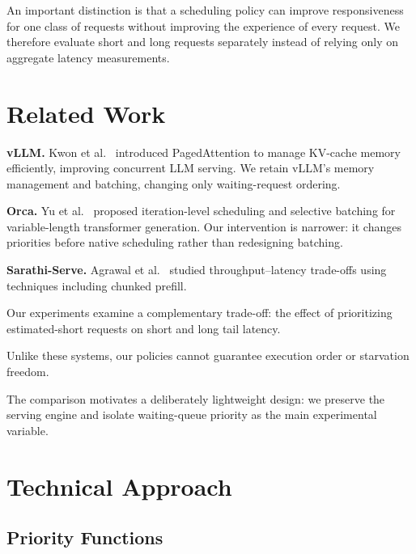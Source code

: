 \documentclass[sigplan,nonacm]{acmart}
\begin{document}
An important distinction is that a scheduling policy
can improve responsiveness for one class of requests
without improving the experience of every request.
We therefore evaluate short and long requests
separately instead of relying only on aggregate
latency measurements.


\section{Related Work}

\textbf{vLLM.}
Kwon et al.~\cite{kwon2023efficient} introduced
PagedAttention to manage KV-cache memory efficiently,
improving concurrent LLM serving. We retain vLLM's
memory management and batching, changing only
waiting-request ordering.

\textbf{Orca.}
Yu et al.~\cite{yu2022orca} proposed iteration-level
scheduling and selective batching for variable-length
transformer generation. Our intervention is narrower:
it changes priorities before native scheduling rather
than redesigning batching.

\textbf{Sarathi-Serve.}
Agrawal et al.~\cite{agrawal2024sarathi} studied
throughput--latency trade-offs using techniques
including chunked prefill.

Our experiments examine a complementary trade-off:
the effect of prioritizing estimated-short requests
on short and long tail latency.

Unlike these systems, our policies cannot guarantee
execution order or starvation freedom.

The comparison motivates a deliberately lightweight
design: we preserve the serving engine and isolate
waiting-queue priority as the main experimental
variable.


\section{Technical Approach}

\subsection{Priority Functions}
\end{document}

